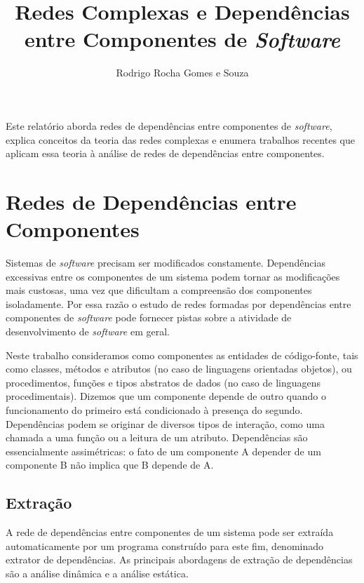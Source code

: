 \documentclass{article}
\begin{document}
\title{Redes Complexas e Dependências entre Componentes de \emph{Software}}
\author{Rodrigo Rocha Gomes e Souza}
\maketitle

Este relatório aborda redes de dependências entre componentes de \emph{software}, explica conceitos da teoria das redes complexas e enumera trabalhos recentes que aplicam essa teoria à análise de redes de dependências entre componentes.

\section{Redes de Dependências entre Componentes}

Sistemas de \textit{software} precisam ser modificados constamente. Dependências excessivas entre os componentes de um sistema podem tornar as modificações mais custosas, uma vez que dificultam a compreensão dos componentes isoladamente. Por essa razão o estudo de redes formadas por dependências entre componentes de \textit{software} pode fornecer pistas sobre a atividade de desenvolvimento de \textit{software} em geral.

Neste trabalho consideramos como componentes as entidades de código-fonte, tais como classes, métodos e atributos (no caso de linguagens orientadas objetos), ou procedimentos, funções e tipos abstratos de dados (no caso de linguagens procedimentais). Dizemos que um componente depende de outro quando o funcionamento do primeiro está condicionado à presença do segundo. Dependências podem se originar de diversos tipos de interação, como uma chamada a uma função ou a leitura de um atributo. Dependências são essencialmente assimétricas: o fato de um componente A depender de um componente B não implica que B depende de A.


\subsection{Extração}

A rede de dependências entre componentes de um sistema pode ser extraída automaticamente por um programa construído para este fim, denominado extrator de dependências. As principais abordagens de extração de dependências são a análise dinâmica e a análise estática. 
\end{document}
